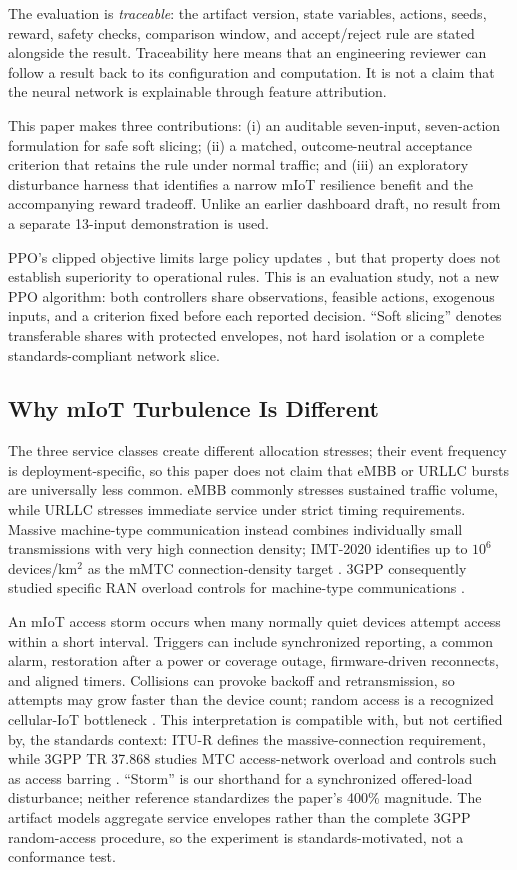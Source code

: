 \documentclass[conference]{IEEEtran}
\begin{document}
The evaluation is \emph{traceable}: the artifact version, state variables, actions, seeds, reward, safety checks, comparison window, and accept/reject rule are stated alongside the result. Traceability here means that an engineering reviewer can follow a result back to its configuration and computation. It is not a claim that the neural network is explainable through feature attribution.

This paper makes three contributions: (i) an auditable seven-input, seven-action formulation for safe soft slicing; (ii) a matched, outcome-neutral acceptance criterion that retains the rule under normal traffic; and (iii) an exploratory disturbance harness that identifies a narrow mIoT resilience benefit and the accompanying reward tradeoff. Unlike an earlier dashboard draft, no result from a separate 13-input demonstration is used.

PPO's clipped objective limits large policy updates \cite{schulman2017}, but that property does not establish superiority to operational rules. This is an evaluation study, not a new PPO algorithm: both controllers share observations, feasible actions, exogenous inputs, and a criterion fixed before each reported decision. ``Soft slicing'' denotes transferable shares with protected envelopes, not hard isolation or a complete standards-compliant network slice.

\subsection{Why mIoT Turbulence Is Different}
The three service classes create different allocation stresses; their event frequency is deployment-specific, so this paper does not claim that eMBB or URLLC bursts are universally less common. eMBB commonly stresses sustained traffic volume, while URLLC stresses immediate service under strict timing requirements. Massive machine-type communication instead combines individually small transmissions with very high connection density; IMT-2020 identifies up to $10^6$ devices/km$^2$ as the mMTC connection-density target \cite{itu2020}. 3GPP consequently studied specific RAN overload controls for machine-type communications \cite{3gpp37868}.

An mIoT access storm occurs when many normally quiet devices attempt access within a short interval. Triggers can include synchronized reporting, a common alarm, restoration after a power or coverage outage, firmware-driven reconnects, and aligned timers. Collisions can provoke backoff and retransmission, so attempts may grow faster than the device count; random access is a recognized cellular-IoT bottleneck \cite{gharbieh2016}. This interpretation is compatible with, but not certified by, the standards context: ITU-R defines the massive-connection requirement, while 3GPP TR 37.868 studies MTC access-network overload and controls such as access barring \cite{itu2020,3gpp37868}. ``Storm'' is our shorthand for a synchronized offered-load disturbance; neither reference standardizes the paper's 400\% magnitude. The artifact models aggregate service envelopes rather than the complete 3GPP random-access procedure, so the experiment is standards-motivated, not a conformance test.
\end{document}
